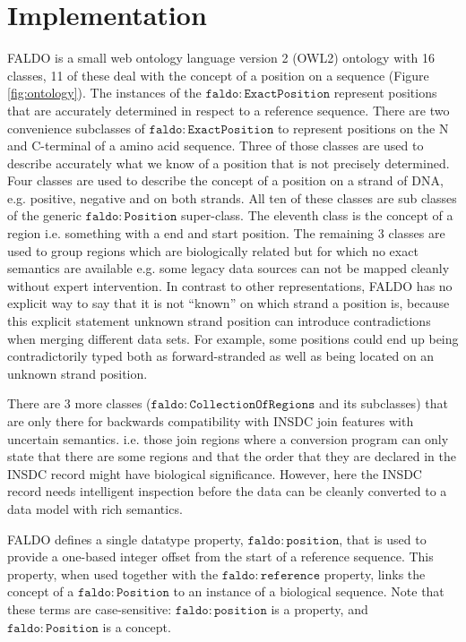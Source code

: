 \section*{Implementation}

FALDO is a small web ontology language version 2 (OWL2) ontology with 16 classes, 11 of these deal with the concept of a position on a sequence (Figure \ref{fig:ontology}).
The instances of the $\mathtt{faldo\colon{}ExactPosition}$ represent positions that are accurately determined in respect to a reference sequence. There are two convenience subclasses of $\mathtt{faldo\colon{}ExactPosition}$ to represent positions on the N and C-terminal of a amino acid sequence.
Three of those classes are used to describe accurately what we know of a position that is not precisely determined.
Four classes are used to describe the concept of a position on a strand of DNA, e.g. positive, negative and on both strands.
All ten of these classes are sub classes of the generic $\mathtt{faldo\colon{}Position}$ super-class.
The eleventh class is the concept of a region i.e. something with a end and start position.
The remaining 3 classes are used to group regions which are biologically related but for which no exact semantics are available e.g. some legacy data sources can not be mapped cleanly without expert intervention.
In contrast to other representations, FALDO has no explicit way to say that it is not ``known'' on which strand a position is, because this explicit statement unknown strand position can introduce contradictions when merging different data sets.
For example, some positions could end up being contradictorily typed both as forward-stranded as well as being located on an unknown strand position.

There are 3 more classes ($\mathtt{faldo\colon{}CollectionOfRegions}$ and its subclasses) that are only there for backwards compatibility with INSDC join features with uncertain semantics. i.e. those join regions where a conversion program can only state that there are some regions and that the order that they are declared in the INSDC record might have biological significance.
However, here the INSDC record needs intelligent inspection before the data can be cleanly converted to a data model with rich semantics.

FALDO defines a single datatype property,
$\mathtt{faldo\colon{}position}$, that is used to provide a one-based
integer offset from the start of a reference sequence.
This property, when used together with the
$\mathtt{faldo\colon{}reference}$ property, links the concept of
a $\mathtt{faldo\colon{}Position}$ to an instance of a biological
sequence.
Note that these terms are case-sensitive:
$\mathtt{faldo\colon{}position}$ is a property, and
$\mathtt{faldo\colon{}Position}$ is a concept.



